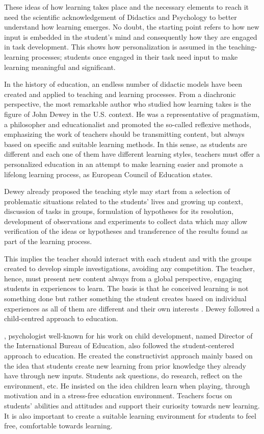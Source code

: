 \documentclass[english]{textolivre}
\begin{document}
These ideas of how learning takes place and the necessary elements to reach it need the scientific acknowledgement of Didactics and Psychology to better understand how learning emerges. No doubt, the starting point refers to how new input is embedded in the student’s mind and consequently how they are engaged in task development. This shows how personalization is assumed in the teaching-learning processes; students once engaged in their task need input to make learning meaningful and significant.

In the history of education, an endless number of didactic models have been created and applied to teaching and learning processes. From a diachronic perspective, the most remarkable author who studied how learning takes is the figure of John Dewey in the U.S. context. He was a representative of pragmatism, a philosopher and educationalist and promoted the so-called reflexive methods, emphasizing the work of teachers should be transmitting content, but always based on specific and suitable learning methods. In this sense, as students are different and each one of them have different learning styles, teachers must offer a personalized education in an attempt to make learning easier and promote a lifelong learning process, as European Council of Education states.

Dewey already proposed the teaching style may start from a selection of problematic situations related to the students’ lives and growing up context, discussion of tasks in groups, formulation of hypotheses for its resolution, development of observations and experiments to collect data which may allow verification of the ideas or hypotheses and transference of the results found as part of the learning process.

This implies the teacher should interact with each student and with the groups created to develop simple investigations, avoiding any competition. The teacher, hence, must present new content always from a global perspective, engaging students in experiences to learn. The basis is that he conceived learning is not something done but rather something the student creates based on individual experiences as all of them are different and their own interests \cite{dewey1971, joyce1986}. Dewey followed a child-centred approach to education.

\textcite{piaget1970}, psychologist well-known for his work on child development, named Director of the International Bureau of Education, also followed the student-centered approach to education. He created the constructivist approach mainly based on the idea that students create new learning from prior knowledge they already have through new inputs. Students ask questions, do research, reflect on the environment, etc. He insisted on the idea children learn when playing, through motivation and in a stress-free education environment. Teachers focus on students’ abilities and attitudes and support their curiosity towards new learning. It is also important to create a suitable learning environment for students to feel free, comfortable towards learning.
\end{document}
